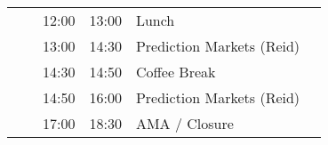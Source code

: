 \begin{table}[h]
\begin{tabular}{  l l l l p{7cm} l    }
    &        & 12:00 & 13:00 & Lunch                                                             &                   \\
    &        & 13:00 & 14:30 & Prediction Markets (Reid)                                         &                   \\
    &        & 14:30 & 14:50 & Coffee Break                                                      &                   \\
    &        & 14:50 & 16:00 & Prediction Markets (Reid)                                         &                   \\
    &        & 17:00 & 18:30 & AMA / Closure                                                     &                  
\end{tabular}
\end{table}






